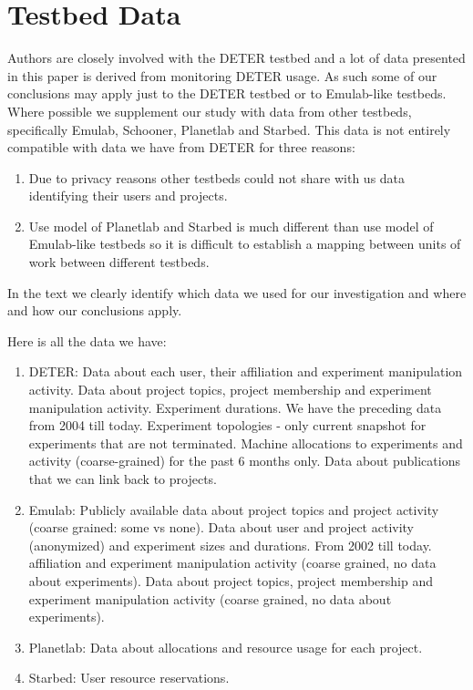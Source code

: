 \section{Testbed Data}
\label{sec:data}


Authors are closely involved with the DETER testbed
\cite{deter} and a lot of data presented in this paper is derived from
monitoring DETER usage. As such some of our conclusions may apply just
to the DETER testbed or to Emulab-like testbeds. Where possible we
supplement our study with data from other testbeds, specifically Emulab,
Schooner, Planetlab and Starbed. This data is not entirely compatible
with data we have from DETER for three reasons: \begin{enumerate} \item
Due to privacy reasons other testbeds could not share with us data
identifying their users and projects. \item Use model of Planetlab and
Starbed is much different than use model of Emulab-like testbeds so it
is difficult to establish a mapping between units of work between
different testbeds. \end{enumerate} In the text we clearly identify
which data we used for our investigation and where and how our
conclusions apply.

Here is all the data we have: \begin{enumerate} \item DETER: Data about
each user, their affiliation and experiment manipulation activity. Data
about project topics, project membership and experiment manipulation
activity. Experiment durations. We have the preceding data from 2004
till today. Experiment topologies - only current snapshot for
experiments that are not terminated. Machine allocations to experiments
and activity (coarse-grained) for the past 6 months only. Data about
publications that we can link back to projects. %
\item Emulab: Publicly available data about project topics and project
activity (coarse grained: some vs none). Data about user and project
activity (anonymized) and experiment sizes and durations. From 2002 till
today. %
affiliation and experiment manipulation activity (coarse grained, no
data about experiments). Data about project topics, project membership
and experiment manipulation activity (coarse grained, no data about
experiments). \item Planetlab: Data about allocations and resource usage
for each project. \item Starbed: User resource reservations.
\end{enumerate}


